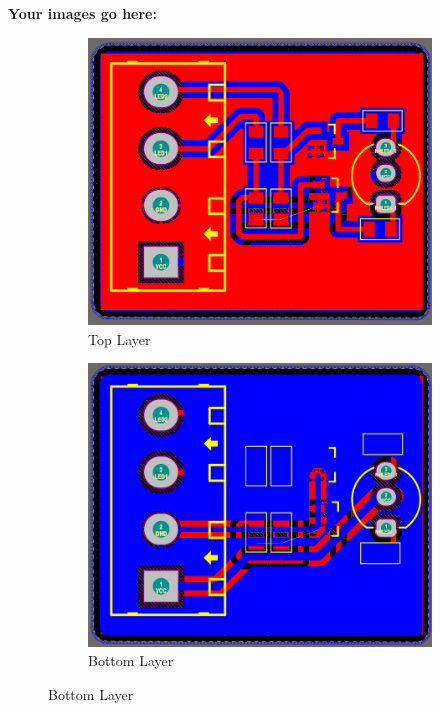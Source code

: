 \textbf{Your images go here:}
\begin{figure}[h!]
    \centering
    \begin{subfigure}{0.495\textwidth}
        \centering
        \includegraphics[width=\textwidth]{graphics/ex2/f2.png}
        \caption*{Top Layer}
    \end{subfigure}
    \hfill
    \begin{subfigure}{0.495\textwidth}
        \centering
        \includegraphics[width=\textwidth]{graphics/ex2/f3.png}
        \caption*{Bottom Layer}
    \end{subfigure}
\end{figure}

